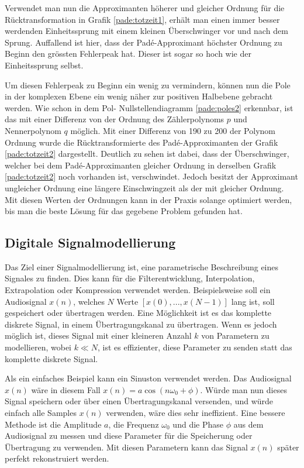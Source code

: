 Verwendet man nun die Approximanten höherer und gleicher Ordnung für die Rücktransformation in Grafik \ref{pade:totzeit1}, erhält man einen immer besser werdenden Einheitssprung mit einem kleinen Überschwinger vor und nach dem Sprung. 
Auffallend ist hier, dass der Padé-Approximant höchster Ordnung zu Beginn den grössten Fehlerpeak hat.
Dieser ist sogar so hoch wie der Einheitssprung selbst.
%

Um diesen Fehlerpeak zu Beginn ein wenig zu vermindern, können nun die Pole in der komplexen Ebene ein wenig näher zur positiven Halbebene gebracht werden.
Wie schon in  dem Pol- Nullstellendiagramm \ref{pade:poles2} erkennbar, ist das mit einer Differenz von der Ordnung des Zählerpolynoms $p$ und Nennerpolynom $q$ möglich.
Mit einer Differenz von 190 zu 200 der Polynom Ordnung wurde die Rücktransformierte des Padé-Approximanten der Grafik \ref{pade:totzeit2} dargestellt.
Deutlich zu sehen ist dabei, dass der Überschwinger, welcher bei dem Padé-Approximanten gleicher Ordnung in derselben Grafik \ref{pade:totzeit2} noch vorhanden ist, verschwindet.
Jedoch besitzt der Approximant ungleicher Ordnung eine längere Einschwingzeit als der mit gleicher Ordnung. 
Mit diesen Werten der Ordnungen kann in der Praxis solange optimiert werden, bis man die beste Lösung für das gegebene Problem gefunden hat.

\FloatBarrier

\subsection{Digitale Signalmodellierung
	\label{pade:subsection:SignalMod}}

Das Ziel einer Signalmodellierung ist, eine parametrische Beschreibung eines Signales zu finden.
%
%
Dies kann für die Filterentwicklung, Interpolation, Extrapolation oder Kompression verwendet werden.
%
%
%
%
Beispielsweise soll ein Audiosignal $x(n)$, welches $N$ Werte
$[x(0),...,x(N-1)]$
lang ist,
soll gespeichert oder übertragen werden.
%
Eine Möglichkeit ist es das komplette diskrete Signal, in einem Übertragungskanal zu übertragen.
Wenn es jedoch möglich ist, dieses Signal mit einer kleineren Anzahl
$k$ von Parametern zu modellieren, wobei $k\ll N$, ist es effizienter,
diese Parameter zu senden statt das komplette diskrete Signal.

Als ein einfaches Beispiel kann ein Sinuston verwendet werden.
Das Audiosignal $x(n)$ wäre in diesem Fall $x(n)= a \cos(n\omega_0 + \phi)$.
Würde man nun dieses Signal speichern oder über einen Übertragungskanal versenden, und würde einfach alle Samples $x(n)$ verwenden, wäre dies sehr ineffizient.
Eine bessere Methode ist die Amplitude $a$, die Frequenz $\omega_0$ und die Phase $\phi$ aus dem Audiosignal zu messen und diese Parameter für die Speicherung oder Übertragung zu verwenden.
Mit diesen Parametern kann das Signal $x(n)$ später perfekt rekonstruiert werden.

